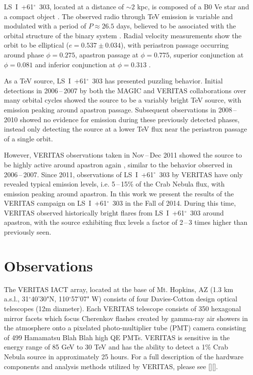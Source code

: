 \documentclass[preprint2]{aastex}
\newcommand{\lsi}{LS~I~+61$^{\circ}$~303}
\begin{document}
\lsi{}, located at a distance of $\sim2$ kpc, is composed of a B0 Ve star and a compact object \citep{HandC1981, Casares2005}. The observed radio through TeV emission is variable and modulated with a period of $P \approx 26.5$ days, believed to be associated with the orbital structure of the binary system \citep{Albert2006, Esposito2007, VERITASLSIDetection, Abdo2009, LiXray, 2015A&A...575L...9M}. Radial velocity measurements show the orbit to be elliptical ($e = 0.537\pm0.034$), with periastron passage occurring around phase $\phi=0.275$, apastron passage at $\phi=0.775$, superior conjunction at $\phi=0.081$ and inferior conjunction at $\phi=0.313$ \citep{Aragona2009}.

As a TeV source, \lsi{} has presented puzzling behavior. Initial detections in 2006\,--\,2007 by both the MAGIC \citep{Albert2006} and VERITAS \citep{VERITASLSIDetection} collaborations over many orbital cycles showed the source to be a variably bright TeV source, with emission peaking around apastron passage. Subsequent observations in 2008\,--\,2010 \citep{2011ApJ...738....3A} showed no evidence for emission during these previously detected phases, instead only detecting the source at a lower TeV flux near the periastron passage of a single orbit. 

However, VERITAS observations taken in Nov\,--\,Dec 2011 showed the source to be highly active around apastron again \citep{2013ApJ...779...88A}, similar to the behavior observed in 2006\,--\,2007. Since 2011, observations of \lsi{} by VERITAS have only revealed typical emission levels, i.e. 5\,--\,15\% of the Crab Nebula flux, with emission peaking around apastron. In this work we present the results of the VERITAS campaign on \lsi{} in the Fall of 2014. During this time, VERITAS observed historically bright flares from \lsi{} around apastron, with the source exhibiting flux levels a factor of 2\,--\,3 times higher than previously seen.

\section{Observations}
The VERITAS IACT array, located at the base of Mt. Hopkins, AZ (1.3 km a.s.l., 31$^{\circ}$40'30"N, 110$^{\circ}$57'07" W) consists of four Davies-Cotton design optical telescopes (12m diameter). Each VERITAS telescope consists of 350 hexagonal mirror facets which focus Cherenkov flashes created by gamma-ray air showers in the atmosphere onto a pixelated photo-multiplier tube (PMT) camera consisting of 499 Hamamatsu Blah Blah high QE PMTs. VERITAS is sensitive in the energy range of 85 GeV to 30 TeV and has the ability to detect a 1$\%$ Crab Nebula source in approximately 25 hours. For a full description of the hardware components and analysis methods utilized by VERITAS, please see [][].
\end{document}
